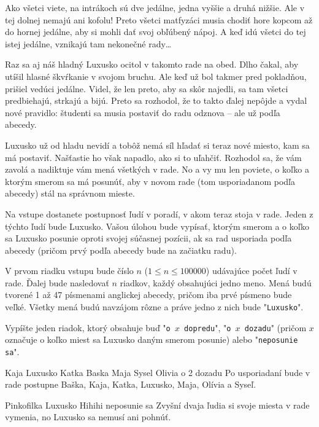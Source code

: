 




Ako všetci viete, na intrákoch sú dve jedálne, jedna vyššie a druhá nižšie.
Ale v tej dolnej nemajú ani kofolu! Preto všetci matfyzáci musia chodiť hore kopcom až
do hornej jedálne, aby si mohli dať svoj obľúbený nápoj. A keď idú všetci do tej
istej jedálne, vznikajú tam nekonečné rady\dots

Raz sa aj náš hladný Luxusko ocitol v takomto rade na obed. Dlho čakal, aby utíšil
hlasné škvŕkanie v svojom bruchu. Ale keď už bol takmer pred pokladňou, prišiel vedúci jedálne.
Videl, že len preto, aby sa skôr najedli, sa tam všetci predbiehajú, strkajú a bijú.
Preto sa rozhodol, že to takto ďalej nepôjde a vydal nové pravidlo:
študenti sa musia postaviť do radu odznova -- ale už podľa abecedy.

Luxusko už od hladu nevidí a tobôž nemá síl hľadať si teraz nové miesto,
kam sa má postaviť. Našťastie ho však napadlo, ako si to uľahčiť. Rozhodol sa, že
vám zavolá a nadiktuje vám mená všetkých v rade. No a vy mu len poviete, o koľko a ktorým smerom sa má
posunúť, aby v novom rade (tom usporiadanom podľa abecedy) stál na správnom mieste.


Na vstupe dostanete postupnosť ľudí v poradí, v akom teraz stoja v rade.
Jeden z týchto ľudí bude Luxusko. Vašou úlohou bude vypísať, ktorým smerom a o
koľko sa Luxusko posunie oproti svojej súčasnej pozícii, ak sa rad usporiada
podľa abecedy (pričom prvý podľa abecedy bude na začiatku radu).


V prvom riadku vstupu bude číslo $n$ ($1\leq n\leq 100000$) udávajúce počet ľudí v
rade. Ďalej bude nasledovať $n$ riadkov, každý obsahujúci jedno meno.
Mená budú tvorené 1 až 47 písmenami anglickej abecedy, pričom iba prvé písmeno
bude veľké. Všetky mená budú navzájom rôzne a práve jedno z nich bude "\texttt{Luxusko}".


Vypíšte jeden riadok, ktorý obsahuje buď "\texttt{o $x$ dopredu}", "\texttt{o
$x$ dozadu}" (pričom $x$ označuje o koľko miest sa Luxusko daným smerom posunie) alebo
"\texttt{neposunie sa}".


Kaja
Luxusko
Katka
Baska
Maja
Sysel
Olivia
\vystup
o 2 dozadu
\komentar
Po usporiadaní bude v rade postupne Baška, Kaja, Katka, Luxusko, Maja, Olívia a Syseľ.
\koniec

Pinkofilka
Luxusko
Hihihi
\vystup
neposunie sa
\komentar
Zvyšní dvaja ľudia si svoje miesta v rade vymenia, no Luxusko sa nemusí ani pohnúť.
\koniec


